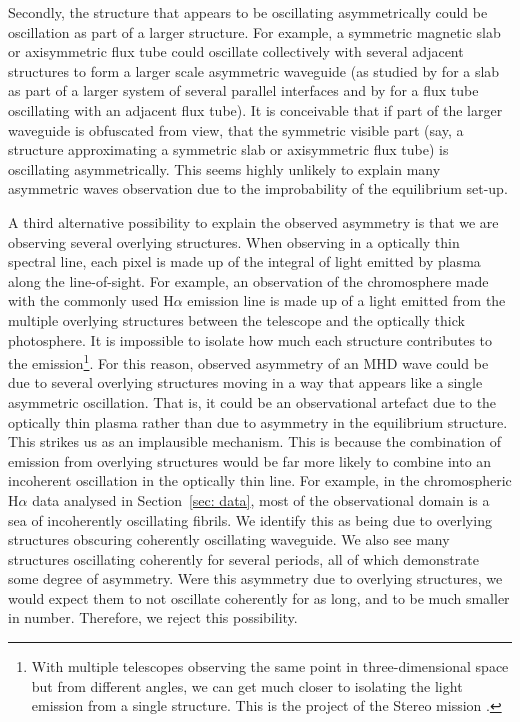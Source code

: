\documentclass[12pt]{../style-files/ociamthesis}
\begin{document}
Secondly, the structure that appears to be oscillating asymmetrically could be oscillation as part of a larger structure. For example, a symmetric magnetic slab or axisymmetric flux tube could oscillate collectively with several adjacent structures to form a larger scale asymmetric waveguide (as studied by \cite{shu_etal18} for a slab as part of a larger system of several parallel interfaces and by \cite{van_etal08} for a flux tube oscillating with an adjacent flux tube). It is conceivable that if part of the larger waveguide is obfuscated from view, that the symmetric visible part (say, a structure approximating a symmetric slab or axisymmetric flux tube) is oscillating asymmetrically. This seems highly unlikely to explain many asymmetric waves observation due to the improbability of the equilibrium set-up.

A third alternative possibility to explain the observed asymmetry is that we are observing several overlying structures. When observing in a optically thin spectral line, each pixel is made up of the integral of light emitted by plasma along the line-of-sight. For example, an observation of the chromosphere made with the commonly used H$\alpha$ emission line is made up of a light emitted from the multiple overlying structures between the telescope and the optically thick photosphere. It is impossible to isolate how much each structure contributes to the emission\footnote{With multiple telescopes observing the same point in three-dimensional space but from different angles, we can get much closer to isolating the light emission from a single structure. This is the project of the Stereo mission \citep{stereo}.}. For this reason, observed asymmetry of an MHD wave could be due to several overlying structures moving in a way that appears like a single asymmetric oscillation. That is, it could be an observational artefact due to the optically thin plasma rather than due to asymmetry in the equilibrium structure. This strikes us as an implausible mechanism. This is because the combination of emission from overlying structures would be far more likely to combine into an incoherent oscillation in the optically thin line. For example, in the chromospheric H$\alpha$ data analysed in Section~\ref{sec: data}, most of the observational domain is a sea of incoherently oscillating fibrils. We identify this as being due to overlying structures obscuring coherently oscillating waveguide. We also see many structures oscillating coherently for several periods, all of which demonstrate some degree of asymmetry. Were this asymmetry due to overlying structures, we would expect them to not oscillate coherently for as long, and to be much smaller in number. Therefore, we reject this possibility.
\end{document}
